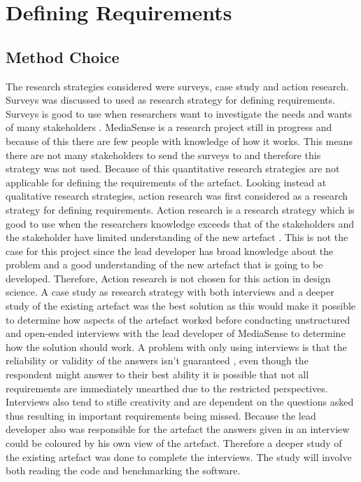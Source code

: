 \section{Defining Requirements}
\subsection{Method Choice}
The research strategies considered were surveys, case study and action research. Surveys was discussed to used as research strategy for defining requirements. Surveys is good to use when researchers want to investigate the needs and wants of many stakeholders \cite{johannesson2012design}. MediaSense is a research project still in progress and because of this there are few people with knowledge of how it works. This means there are not many stakeholders to send the surveys to and therefore this strategy was not used. Because of this quantitative research strategies are not applicable for defining the requirements of the artefact. 
Looking instead at qualitative research strategies, action research was first considered as a research strategy for defining requirements. Action research is a research strategy which is good to use when the researchers knowledge exceeds that of the stakeholders and the stakeholder have limited understanding of the new artefact \cite{johannesson2012design}. This is not the case for this project since the lead developer has broad knowledge about the problem and a good understanding of the new artefact that is going to be developed. Therefore, Action research is not chosen for this action in design science. 
A case study as research strategy with both interviews and a deeper study of the existing artefact was the best solution as this would make it possible to determine how aspects of the artefact worked before conducting unstructured and open-ended interviews with the lead developer of MediaSense to determine how the solution should work. A problem with only using interviews is that the reliability or validity of the answers isn't guaranteed \cite{golafshani2003understanding}, even though the respondent might answer to their best ability it is possible that not all requirements are immediately unearthed due to the restricted perspectives. Interviews also tend to stifle creativity and are dependent on the questions asked \cite{johannesson2012design} thus resulting in important requirements being missed. Because the lead developer also was responsible for the artefact the answers given in an interview could be coloured by his own view of the artefact. Therefore a deeper study of the existing artefact was done to complete the interviews. The study will involve both reading the code and benchmarking the software.


